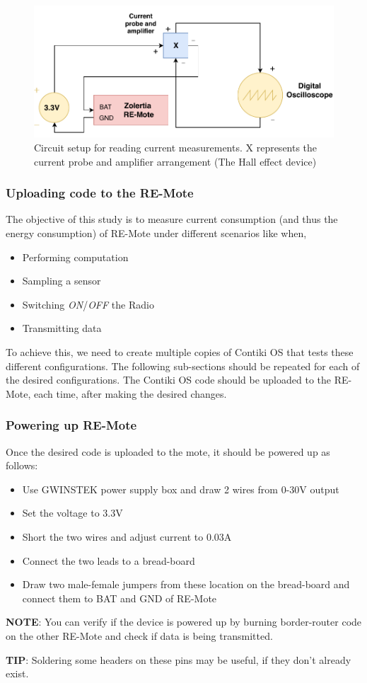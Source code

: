 \documentclass[a4paper]{article}
\begin{document}
\begin{figure}
\includegraphics[width=1\textwidth]{images/circuit.pdf}
\caption{\label{fig:circuit}Circuit setup for reading current measurements. X represents the current probe and amplifier arrangement (The Hall effect device)}
\end{figure}

\subsubsection{Uploading code to the RE-Mote}
The objective of this study is to measure current consumption (and thus the energy consumption) of RE-Mote under different scenarios like when,
\begin{itemize}
	\item{Performing computation}
    \item{Sampling a sensor}
    \item{Switching \emph{ON}/\emph{OFF} the Radio}
    \item{Transmitting data}
\end{itemize}
To achieve this, we need to create multiple copies of Contiki OS that tests these different configurations.
The following sub-sections should be repeated for each of the desired configurations. The Contiki OS code should be uploaded to the RE-Mote, each time, after making the desired changes.


\subsubsection{Powering up RE-Mote}
Once the desired code is uploaded to the mote, it should be powered up as follows:
\begin{itemize}
	\item{Use GWINSTEK power supply box and draw 2 wires from 0-30V output}
    \item{Set the voltage to 3.3V}
    \item{Short the two wires and adjust current to 0.03A}
    \item{Connect the two leads to a bread-board}
    \item{Draw two male-female jumpers from these location on the bread-board
      and connect them to BAT and GND of RE-Mote}
\end{itemize}
\textbf{NOTE}: You can verify if the device is powered up by burning border-router
        code on the other RE-Mote and check if data is being transmitted. \par
\textbf{TIP}: Soldering some headers on these pins may be useful, if they don't already exist.
\end{document}
